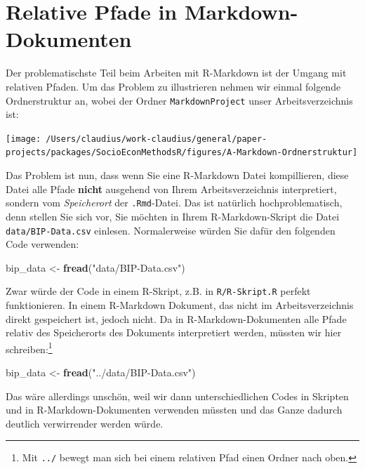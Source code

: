 \documentclass[]{book}
\newenvironment{Shaded}{\begin{snugshade}}{\end{snugshade}}
\newcommand{\KeywordTok}[1]{\textcolor[rgb]{0.13,0.29,0.53}{\textbf{#1}}}
\newcommand{\StringTok}[1]{\textcolor[rgb]{0.31,0.60,0.02}{#1}}
\newcommand{\NormalTok}[1]{#1}
\let\rmarkdownfootnote\footnote%
\def\footnote{\protect\rmarkdownfootnote}
\begin{document}
\section{Relative Pfade in
Markdown-Dokumenten}\label{relative-pfade-in-markdown-dokumenten}

Der problematischste Teil beim Arbeiten mit R-Markdown ist der Umgang
mit relativen Pfaden. Um das Problem zu illustrieren nehmen wir einmal
folgende Ordnerstruktur an, wobei der Ordner \texttt{MarkdownProject}
unser Arbeitsverzeichnis ist:

\begin{center}\texttt{[image: /Users/claudius/work-claudius/general/paper-projects/packages/SocioEconMethodsR/figures/A-Markdown-Ordnerstruktur]} \end{center}

Das Problem ist nun, dass wenn Sie eine R-Markdown Datei kompillieren,
diese Datei alle Pfade \textbf{nicht} ausgehend von Ihrem
Arbeitsverzeichnis interpretiert, sondern vom \emph{Speicherort} der
\texttt{.Rmd}-Datei. Das ist natürlich hochproblematisch, denn stellen
Sie sich vor, Sie möchten in Ihrem R-Markdown-Skript die Datei
\texttt{data/BIP-Data.csv} einlesen. Normalerweise würden Sie dafür den
folgenden Code verwenden:

\begin{Shaded}
\begin{Highlighting}[]
\NormalTok{bip_data <-}\StringTok{ }\KeywordTok{fread}\NormalTok{(}\StringTok{"data/BIP-Data.csv"}\NormalTok{)}
\end{Highlighting}
\end{Shaded}

Zwar würde der Code in einem R-Skript, z.B. in \texttt{R/R-Skript.R}
perfekt funktionieren. In einem R-Markdown Dokument, das nicht im
Arbeitsverzeichnis direkt gespeichert ist, jedoch nicht. Da in
R-Markdown-Dokumenten alle Pfade relativ des Speicherorts des Dokuments
interpretiert werden, müssten wir hier schreiben:\footnote{Mit
  \texttt{../} bewegt man sich bei einem relativen Pfad einen Ordner
  nach oben.}

\begin{Shaded}
\begin{Highlighting}[]
\NormalTok{bip_data <-}\StringTok{ }\KeywordTok{fread}\NormalTok{(}\StringTok{"../data/BIP-Data.csv"}\NormalTok{)}
\end{Highlighting}
\end{Shaded}

Das wäre allerdings unschön, weil wir dann unterschiedlichen Codes in
Skripten und in R-Markdown-Dokumenten verwenden müssten und das Ganze
dadurch deutlich verwirrender werden würde.
\end{document}
